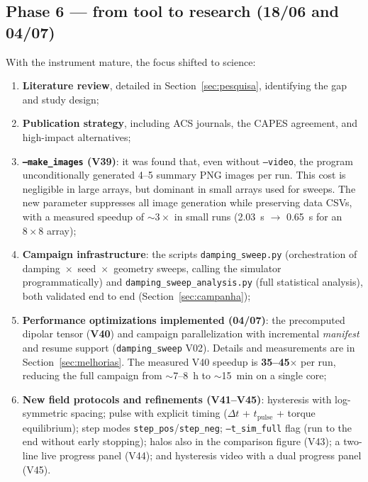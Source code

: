 \documentclass[11pt,a4paper]{article}
\newcommand{\code}[1]{\texttt{#1}}
\begin{document}
\subsection{Phase 6 --- from tool to research (18/06 and 04/07)}

With the instrument mature, the focus shifted to science:

\begin{enumerate}
\item \textbf{Literature review}, detailed in Section~\ref{sec:pesquisa}, identifying the gap and study design;
\item \textbf{Publication strategy}, including ACS journals, the CAPES agreement, and high-impact alternatives;
\item \textbf{\code{--make\_images} (V39)}: it was found that, even without \code{--video}, the program unconditionally generated 4--5 summary PNG images per run. This cost is negligible in large arrays, but dominant in small arrays used for sweeps. The new parameter suppresses all image generation while preserving data CSVs, with a measured speedup of $\sim 3\times$ in small runs (2.03~s $\to$ 0.65~s for an $8\times8$ array);
\item \textbf{Campaign infrastructure}: the scripts \code{damping\_sweep.py} (orchestration of damping~$\times$~seed~$\times$~geometry sweeps, calling the simulator programmatically) and \code{damping\_sweep\_analysis.py} (full statistical analysis), both validated end to end (Section~\ref{sec:campanha});
\item \textbf{Performance optimizations implemented (04/07)}: the precomputed dipolar tensor (\textbf{V40}) and campaign parallelization with incremental \emph{manifest} and resume support (\code{damping\_sweep} V02). Details and measurements are in Section~\ref{sec:melhorias}. The measured V40 speedup is \textbf{35--45$\times$} per run, reducing the full campaign from $\sim$7--8~h to $\sim$15~min on a single core;
\item \textbf{New field protocols and refinements (V41--V45)}: hysteresis with log-symmetric spacing; pulse with explicit timing ($\Delta t$ + $t_{\mathrm{pulse}}$ + torque equilibrium); step modes \code{step\_pos}/\code{step\_neg}; \code{--t\_sim\_full} flag (run to the end without early stopping); halos also in the comparison figure (V43); a two-line live progress panel (V44); and hysteresis video with a dual progress panel (V45).
\end{enumerate}
\end{document}
